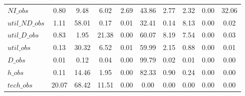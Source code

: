 \begin{center}
\begin{longtable}{lccccccccc}
$NI\_obs        $	 & 	         0.80	 & 	         9.48	 & 	         6.02	 & 	         2.69	 & 	        43.86	 & 	         2.77	 & 	         2.32	 & 	         0.00	 & 	        32.06 \\ 
$util\_ND\_obs  $	 & 	         1.11	 & 	        58.01	 & 	         0.17	 & 	         0.01	 & 	        32.41	 & 	         0.14	 & 	         8.13	 & 	         0.00	 & 	         0.02 \\ 
$util\_D\_obs   $	 & 	         0.83	 & 	         1.95	 & 	        21.38	 & 	         0.00	 & 	        60.07	 & 	         8.19	 & 	         7.54	 & 	         0.00	 & 	         0.03 \\ 
$util\_obs      $	 & 	         0.13	 & 	        30.32	 & 	         6.52	 & 	         0.01	 & 	        59.99	 & 	         2.15	 & 	         0.88	 & 	         0.00	 & 	         0.01 \\ 
$D\_obs         $	 & 	         0.01	 & 	         0.12	 & 	         0.04	 & 	         0.00	 & 	        99.79	 & 	         0.02	 & 	         0.01	 & 	         0.00	 & 	         0.00 \\ 
$h\_obs         $	 & 	         0.11	 & 	        14.46	 & 	         1.95	 & 	         0.00	 & 	        82.33	 & 	         0.90	 & 	         0.24	 & 	         0.00	 & 	         0.00 \\ 
$tech\_obs      $	 & 	        20.07	 & 	        68.42	 & 	        11.51	 & 	         0.00	 & 	         0.00	 & 	         0.00	 & 	         0.00	 & 	         0.00	 & 	         0.00 \\ 
\end{longtable}
 \end{center}
